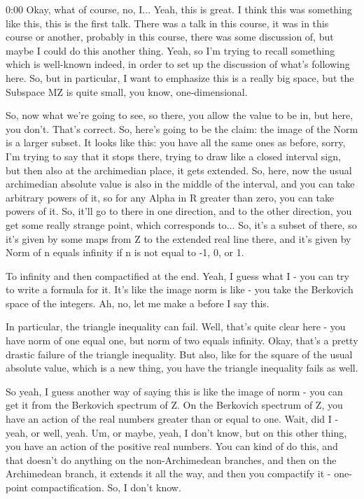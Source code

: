 \begin{unfinished}{0:00}
Okay, what of course, no, I... Yeah, this is great. I think this was something like this, this is the first talk. There was a talk in this course, it was in this course or another, probably in this course, there was some discussion of, but maybe I could do this another thing. Yeah, so I'm trying to recall something which is well-known indeed, in order to set up the discussion of what's following here. So, but in particular, I want to emphasize this is a really big space, but the Subspace MZ is quite small, you know, one-dimensional.

So, now what we're going to see, so there, you allow the value to be in, but here, you don't. That's correct. So, here's going to be the claim: the image of the Norm is a larger subset. It looks like this: you have all the same ones as before, sorry, I'm trying to say that it stops there, trying to draw like a closed interval sign, but then also at the archimedian place, it gets extended. So, here, now the usual archimedian absolute value is also in the middle of the interval, and you can take arbitrary powers of it, so for any Alpha in R greater than zero, you can take powers of it. So, it'll go to there in one direction, and to the other direction, you get some really strange point, which corresponds to... So, it's a subset of there, so it's given by some maps from Z to the extended real line there, and it's given by Norm of n equals infinity if n is not equal to -1, 0, or 1.

To infinity and then compactified at the end. Yeah, I guess what I - you can try to write a formula for it. It's like the image norm is like - you take the Berkovich space of the integers. Ah, no, let me make a before I say this.

In particular, the triangle inequality can fail. Well, that's quite clear here - you have norm of one equal one, but norm of two equals infinity. Okay, that's a pretty drastic failure of the triangle inequality. But also, like for the square of the usual absolute value, which is a new thing, you have the triangle inequality fails as well.

So yeah, I guess another way of saying this is like the image of norm - you can get it from the Berkovich spectrum of Z. On the Berkovich spectrum of Z, you have an action of the real numbers greater than or equal to one. Wait, did I - yeah, or well, yeah. Um, or maybe, yeah, I don't know, but on this other thing, you have an action of the positive real numbers. You can kind of do this, and that doesn't do anything on the non-Archimedean branches, and then on the Archimedean branch, it extends it all the way, and then you compactify it - one-point compactification. So, I don't know.


\end{unfinished}
